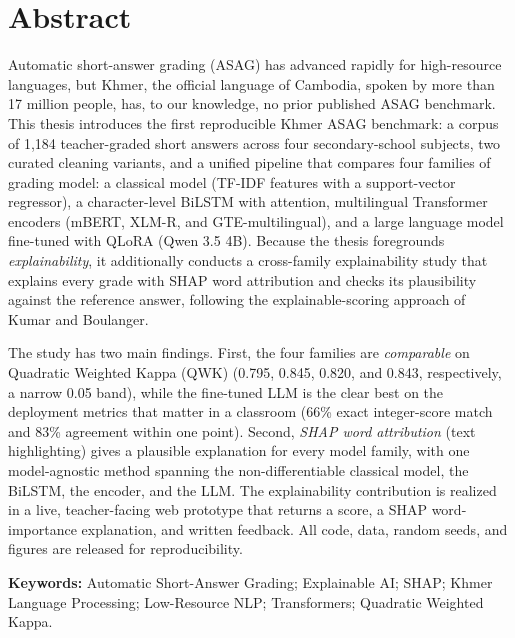 \chapter*{Abstract}

Automatic short-answer grading (ASAG) has advanced rapidly for high-resource languages, but
Khmer, the official language of Cambodia, spoken by more than 17 million people, has, to our
knowledge, no prior published ASAG benchmark. This thesis introduces the first reproducible Khmer
ASAG benchmark: a corpus of 1{,}184 teacher-graded short answers across four secondary-school
subjects, two curated cleaning variants, and a unified pipeline that compares four families of
grading model: a classical model (TF-IDF features with a support-vector regressor), a
character-level BiLSTM with attention, multilingual Transformer encoders (mBERT, XLM-R, and
GTE-multilingual), and a large language model fine-tuned with QLoRA (Qwen 3.5 4B). Because the thesis
foregrounds \emph{explainability}, it additionally conducts a cross-family explainability study that
explains every grade with SHAP word attribution and checks its plausibility against the reference
answer, following the explainable-scoring approach of Kumar and Boulanger.

The study has two main findings. First, the four families are \emph{comparable} on Quadratic
Weighted Kappa (QWK) (0.795, 0.845, 0.820, and 0.843, respectively, a narrow 0.05 band), while the
fine-tuned LLM is the clear best on the deployment metrics that matter in a classroom (66\% exact
integer-score match and 83\% agreement within one point). Second, \emph{SHAP word attribution} (text
highlighting) gives a plausible explanation for every model family, with one model-agnostic method
spanning the non-differentiable classical model, the BiLSTM, the encoder, and the LLM. The
explainability contribution is realized in a live, teacher-facing web prototype that
returns a score, a SHAP word-importance explanation, and written feedback. All code, data,
random seeds, and figures are released for reproducibility.

\vspace{0.4cm}
\noindent\textbf{Keywords:} Automatic Short-Answer Grading; Explainable AI; SHAP; Khmer
Language Processing; Low-Resource NLP; Transformers; Quadratic Weighted Kappa.
\clearpage
